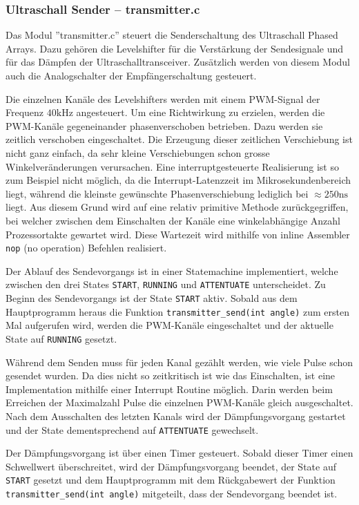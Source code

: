 \subsubsection{Ultraschall Sender -- transmitter.c}\label{sec:ultraschall_sender}
Das Modul ''transmitter.c'' steuert die Senderschaltung des Ultraschall Phased Arrays. Dazu gehören die Levelshifter für die Verstärkung der Sendesignale und für das Dämpfen der Ultraschalltransceiver. Zusätzlich werden von diesem Modul auch die Analogschalter der Empfängerschaltung gesteuert.

Die einzelnen Kanäle des Levelshifters werden mit einem PWM-Signal der Frequenz $40 \mathrm{kHz}$ angesteuert. Um eine Richtwirkung zu erzielen, werden die PWM-Kanäle gegeneinander phasenverschoben betrieben. Dazu werden sie zeitlich verschoben eingeschaltet. Die Erzeugung dieser zeitlichen Verschiebung ist nicht ganz einfach, da sehr kleine Verschiebungen schon grosse Winkelveränderungen verursachen. Eine interruptgesteuerte Realisierung ist so zum Beispiel nicht möglich, da die Interrupt-Latenzzeit im Mikrosekundenbereich liegt, während die kleinste gewünschte Phasenverschiebung lediglich bei $\approx 250 \mathrm{ns}$ liegt. Aus diesem Grund wird auf eine relativ primitive Methode zurückgegriffen, bei welcher zwischen dem Einschalten der Kanäle eine winkelabhängige Anzahl Prozessortakte gewartet wird. Diese Wartezeit wird mithilfe von inline Assembler \texttt{nop} (no operation) Befehlen realisiert.

Der Ablauf des Sendevorgangs ist in einer Statemachine implementiert, welche zwischen den drei States \texttt{START}, \texttt{RUNNING} und \texttt{ATTENTUATE} unterscheidet. Zu Beginn des Sendevorgangs ist der State \texttt{START} aktiv. Sobald aus dem Hauptprogramm heraus die Funktion \texttt{transmitter\_send(int angle)} zum ersten Mal aufgerufen wird, werden die PWM-Kanäle eingeschaltet und der aktuelle State auf \texttt{RUNNING} gesetzt.

Während dem Senden muss für jeden Kanal gezählt werden, wie viele Pulse schon gesendet wurden. Da dies nicht so zeitkritisch ist wie das Einschalten, ist eine Implementation mithilfe einer Interrupt Routine möglich. Darin werden beim Erreichen der Maximalzahl Pulse die einzelnen PWM-Kanäle gleich ausgeschaltet. Nach dem Ausschalten des letzten Kanals wird der Dämpfungsvorgang gestartet und der State dementsprechend auf \texttt{ATTENTUATE} gewechselt.

Der Dämpfungsvorgang ist über einen Timer gesteuert. Sobald dieser Timer einen Schwellwert überschreitet, wird der Dämpfungsvorgang beendet, der State auf \texttt{START} gesetzt und dem Hauptprogramm mit dem Rückgabewert der Funktion \texttt{transmitter\_send(int angle)} mitgeteilt, dass der Sendevorgang beendet ist.

